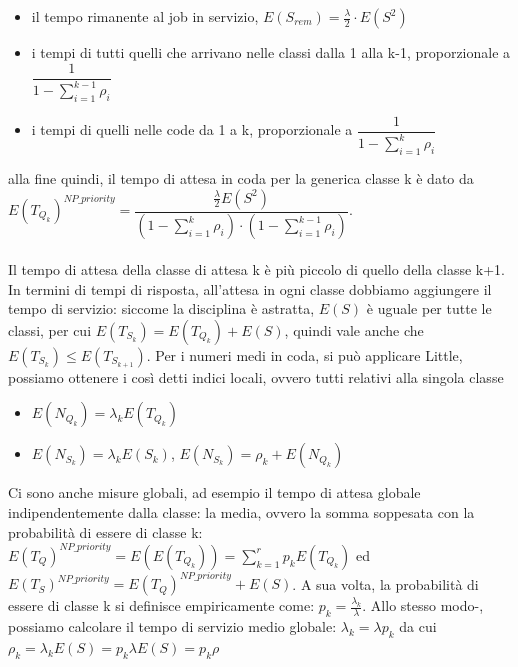 \documentclass{article}
\begin{document}
\begin{itemize}
\item il tempo rimanente al job in servizio, $E(S_{rem}) = \frac{\lambda}{2}\cdot E(S^2)$
\item i tempi di tutti quelli che arrivano nelle classi dalla 1 alla k-1, proporzionale a $\dfrac{1}{1 - \sum\limits_{i=1}^{k-1} \rho_i}$
\item i tempi di quelli nelle code da 1 a k, proporzionale a $\dfrac{1}{1 - \sum\limits_{i=1}^{k} \rho_i}$ 
\end{itemize}
alla fine quindi, il tempo di attesa in coda per la generica classe k è dato da $E(T_{Q_k})^{NP\_priority} = \dfrac{\frac{\lambda}{2} E(S^2)}{(1 - \sum\limits_{i=1}^{k} \rho_i)\cdot (1 - \sum\limits_{i=1}^{k-1} \rho_i)}$.\\\\
Il tempo di attesa della classe di attesa k è più piccolo di quello della classe k+1. In termini di tempi di risposta, all'attesa in ogni classe dobbiamo aggiungere il tempo di servizio: siccome la disciplina è astratta, $E(S)$ è uguale per tutte le classi, per cui $E(T_{S_k}) = E(T_{Q_k}) + E(S)$, quindi vale anche che $E(T_{S_k}) \leq E(T_{S_{k+1}})$. Per i numeri medi in coda, si può applicare Little, possiamo ottenere i così detti indici locali, ovvero tutti relativi alla singola classe
\begin{itemize}
\item $E(N_{Q_k}) = \lambda_k E(T_{Q_k})$
\item $E(N_{S_k}) = \lambda_k E(S_k)$, $E(N_{S_k}) = \rho_k + E(N_{Q_k})$
\end{itemize} 
Ci sono anche misure globali, ad esempio il tempo di attesa globale indipendentemente dalla classe: la media, ovvero la somma soppesata con la probabilità di essere di classe k: $E(T_Q)^{NP\_priority} = E(E(T_{Q_k})) = \sum\limits_{k=1}^{r} p_k E(T_{Q_k})$ ed $E(T_S)^{NP\_priority} = E(T_Q)^{NP\_priority} + E(S)$. A sua volta, la probabilità di essere di classe k si definisce empiricamente come: $p_k = \frac{\lambda_k}{\lambda}$. Allo stesso modo-, possiamo calcolare il tempo di servizio medio globale: $\lambda_k = \lambda p_k$ da cui $\rho_k = \lambda_k E(S) = p_k \lambda E(S) = p_k \rho$
\end{document}
